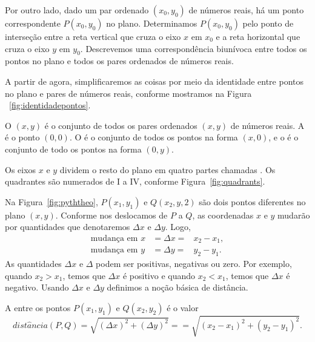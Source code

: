 \documentclass{svmono}
\begin{document}
Por outro lado, dado um par ordenado $(x_0,y_0)$ de números reais, há um
ponto correspondente $P(x_0,y_0)$ no plano. Determinamos $P(x_0,y_0)$ pelo
ponto de interseção entre a reta vertical que cruza o eixo $x$ em $x_0$
e a reta horizontal que cruza o eixo $y$ em $y_0$. Descrevemos uma
correspondência biunívoca entre todos os pontos no plano e todos os
pares ordenados de números reais.

A partir de agora, simplificaremos as coisas por meio da identidade entre
pontos no plano e pares de números reais, conforme mostramos na Figura%
~\ref{fig:identidadepontos}.



\begin{defin}
O  $(x,y)$ é o conjunto de todos os pares ordenados $(x,y)$
de números reais. A  é o ponto $(0,0)$. O 
é o conjunto de todos os pontos na forma $(x,0)$, e o  é
o conjunto de todo os pontos na forma $(0,y)$. 
\end{defin}

Os eixos $x$ e $y$ dividem o resto do plano em quatro partes chamadas
. Os quadrantes são numerados de I a IV, conforme
Figura~\ref{fig:quadrants}.

Na Figura~\ref{fig:pyththeo}, $P(x_1,y_1)$ e $Q(x_2,y,2)$ são dois
pontos diferentes no plano $(x,y)$. Conforme nos deslocamos de $P$
a $Q$, as coordenadas $x$ e $y$ mudarão por quantidades que
denotaremos $\Delta x$ e $\Delta y$. Logo,
\begin{eqnarray*}
\text{mudança em } x & = \Delta x = & x_2 - x_1, \\
\text{mudança em } y & = \Delta y = & y_2 - y_1.
\end{eqnarray*}
As quantidades $\Delta x$ e $\Delta$ podem ser positivas, negativas ou
zero. Por exemplo, quando $x_2 > x_1$, temos que $\Delta x$ é positivo
e quando $x_2 < x_1$, temos que $\Delta x$ é negativo. Usando $\Delta x$
e $\Delta y$ definimos a noção básica de distância.



\begin{defin}
A  entre os pontos $P(x_1,y_1)$ e $Q(x_2,y_2)$ é
o valor
\[
  dist\hat{a}ncia(P,Q) = \sqrt{(\Delta x)^2 + (\Delta y)^2} =
                       = \sqrt{(x_2 - x_1)^2 + (y_2 - y_1)^2}.
\]
\end{defin}
\end{document}
